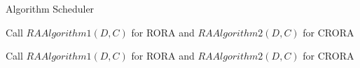 \documentclass[times]{dacauth}
\begin{document}
\par
 \begin{algorithm}	
   \caption{Algorithm Scheduler}
   \label{algorthm1}
    \begin{algorithmic}[1]

        
        \State Call $RAAlgorithm1(D,C)$ for RORA and $RAAlgorithm2(D,C)$ for CRORA
        
        	\State Call $RAAlgorithm1(D,C)$ for RORA and $RAAlgorithm2(D,C)$ for CRORA
        	\EndIf       	
        \EndWhile
        	
	\EndProcedure

\end{algorithmic}
\end{algorithm}
\end{document}
